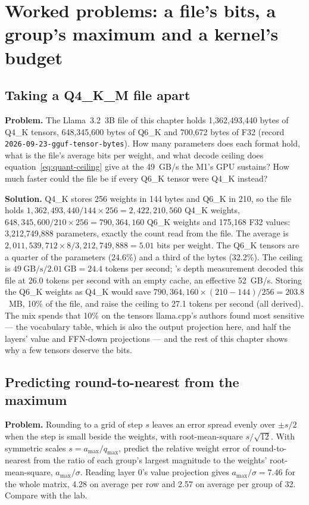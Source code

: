 \section{Worked problems: a file's bits, a group's maximum and a kernel's budget}

\subsection{Taking a Q4\_K\_M file apart}
\textbf{Problem.} The Llama~3.2~3B file of this chapter holds 1,362,493,440 bytes
of Q4\_K tensors, 648,345,600 bytes of Q6\_K and 700,672 bytes of F32 (record
\texttt{2026-09-23-gguf-tensor-bytes}). How many parameters does each format
hold, what is the file's average bits per weight, and what decode ceiling does
equation~\eqref{eq:quant-ceiling} give at the 49~GB/s the M1's GPU sustains? How
much faster could the file be if every Q6\_K tensor were Q4\_K instead?

\textbf{Solution.} Q4\_K stores 256 weights in 144 bytes and Q6\_K in 210, so the
file holds $1{,}362{,}493{,}440 / 144 \times 256 = 2{,}422{,}210{,}560$ Q4\_K weights,
$648{,}345{,}600 / 210 \times 256 = 790{,}364{,}160$ Q6\_K weights and 175,168 F32
values: 3,212,749,888 parameters, exactly the count read from the file. The
average is $2{,}011{,}539{,}712 \times 8 / 3{,}212{,}749{,}888 = 5.01$ bits per weight.
The Q6\_K tensors are a quarter of the parameters (24.6\%) and a third of the
bytes (32.2\%). The ceiling is $49~\text{GB/s} / 2.01~\text{GB} = 24.4$ tokens per
second; 's depth measurement decoded this file at 26.0
tokens per second with an empty cache, an effective 52~GB/s. Storing the Q6\_K
weights as Q4\_K would save $790{,}364{,}160 \times (210 - 144)/256 = 203.8$~MB,
10\% of the file, and raise the ceiling to 27.1 tokens per second (all derived).
The mix spends that 10\% on the tensors llama.cpp's authors found most
sensitive --- the vocabulary table, which is also the output projection here,
and half the layers' value and FFN-down projections --- and the rest of this
chapter shows why a few tensors deserve the bits.

\subsection{Predicting round-to-nearest from the maximum}
\textbf{Problem.} Rounding to a grid of step $s$ leaves an error spread evenly over
$\pm s/2$ when the step is small beside the weights, with root-mean-square
$s/\sqrt{12}$. With symmetric scales $s = a_{\max}/q_{\max}$, predict the relative
weight error of round-to-nearest from the ratio of each group's largest
magnitude to the weights' root-mean-square, $a_{\max}/\sigma$. Reading layer 0's
value projection gives $a_{\max}/\sigma = 7.46$ for the whole matrix, 4.28 on
average per row and 2.57 on average per group of 32. Compare with the lab.

